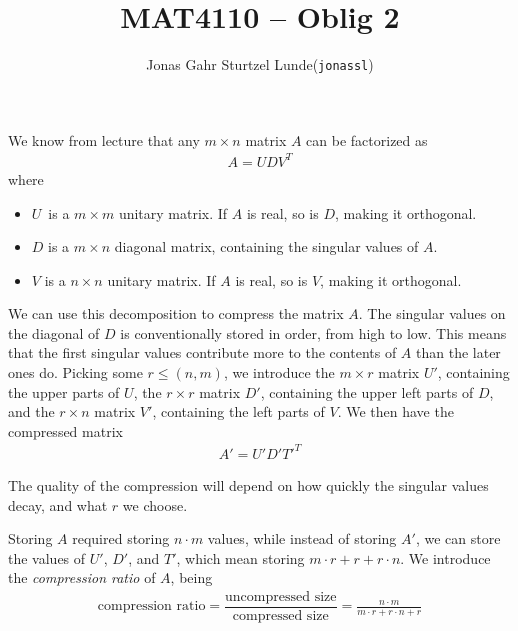 \documentclass[12p,a4paper]{article}
\begin{document}
\title{MAT4110 -- Oblig 2}
\author{
    \begin{tabular}{r l}
        Jonas Gahr Sturtzel Lunde & (\texttt{jonassl})
    \end{tabular}}

\maketitle

\hspace{10cm}

We know from lecture that any $m\times n$ matrix $A$ can be factorized as
\begin{align*}
    A = UDV^T
\end{align*}
where
\begin{itemize}
    \item $U$ is a $m\times m$ unitary matrix. If $A$ is real, so is $D$, making it orthogonal.
    \item $D$ is a $m\times n$ diagonal matrix, containing the singular values of $A$.
    \item $V$ is a $n\times n$ unitary matrix. If $A$ is real, so is $V$, making it orthogonal.
\end{itemize}

We can use this decomposition to compress the matrix $A$. The singular values on the diagonal of $D$ is conventionally stored in order, from high to low. This means that the first singular values contribute more to the contents of $A$ than the later ones do. Picking some $r \leq (n,m)$, we introduce the $m\times r$ matrix $U'$, containing the upper parts of $U$, the $r\times r$ matrix $D'$, containing the upper left parts of $D$, and the $r\times n$ matrix $V'$, containing the left parts of $V$. We then have the compressed matrix
\begin{align*}
    A' = U'D'T'^T
\end{align*}

The quality of the compression will depend on how quickly the singular values decay, and what $r$ we choose.

Storing $A$ required storing $n\cdot m$ values, while instead of storing $A'$, we can store the values of $U'$, $D'$, and $T'$, which mean storing $m\cdot r + r + r\cdot n$. We introduce the \textit{compression ratio} of $A$, being
\begin{align*}
    \text{compression ratio} = \dfrac{\text{uncompressed size}}{\text{compressed size}} = \frac{n\cdot m}{m\cdot r + r\cdot n + r} 
\end{align*}
\end{document}
